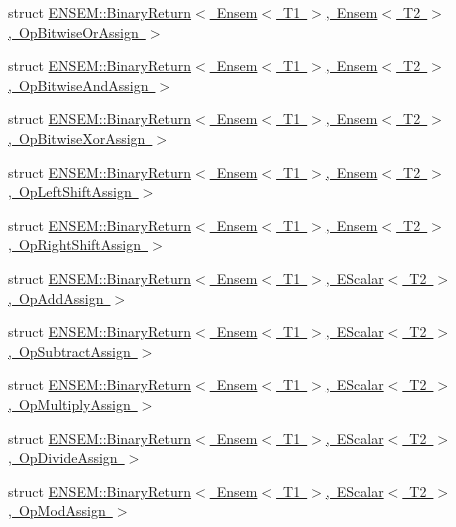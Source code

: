 \begin{DoxyCompactItemize}
\item 
struct \mbox{\hyperlink{structENSEM_1_1BinaryReturn_3_01Ensem_3_01T1_01_4_00_01Ensem_3_01T2_01_4_00_01OpBitwiseOrAssign_01_4}{E\+N\+S\+E\+M\+::\+Binary\+Return$<$ Ensem$<$ T1 $>$, Ensem$<$ T2 $>$, Op\+Bitwise\+Or\+Assign $>$}}
\item 
struct \mbox{\hyperlink{structENSEM_1_1BinaryReturn_3_01Ensem_3_01T1_01_4_00_01Ensem_3_01T2_01_4_00_01OpBitwiseAndAssign_01_4}{E\+N\+S\+E\+M\+::\+Binary\+Return$<$ Ensem$<$ T1 $>$, Ensem$<$ T2 $>$, Op\+Bitwise\+And\+Assign $>$}}
\item 
struct \mbox{\hyperlink{structENSEM_1_1BinaryReturn_3_01Ensem_3_01T1_01_4_00_01Ensem_3_01T2_01_4_00_01OpBitwiseXorAssign_01_4}{E\+N\+S\+E\+M\+::\+Binary\+Return$<$ Ensem$<$ T1 $>$, Ensem$<$ T2 $>$, Op\+Bitwise\+Xor\+Assign $>$}}
\item 
struct \mbox{\hyperlink{structENSEM_1_1BinaryReturn_3_01Ensem_3_01T1_01_4_00_01Ensem_3_01T2_01_4_00_01OpLeftShiftAssign_01_4}{E\+N\+S\+E\+M\+::\+Binary\+Return$<$ Ensem$<$ T1 $>$, Ensem$<$ T2 $>$, Op\+Left\+Shift\+Assign $>$}}
\item 
struct \mbox{\hyperlink{structENSEM_1_1BinaryReturn_3_01Ensem_3_01T1_01_4_00_01Ensem_3_01T2_01_4_00_01OpRightShiftAssign_01_4}{E\+N\+S\+E\+M\+::\+Binary\+Return$<$ Ensem$<$ T1 $>$, Ensem$<$ T2 $>$, Op\+Right\+Shift\+Assign $>$}}
\item 
struct \mbox{\hyperlink{structENSEM_1_1BinaryReturn_3_01Ensem_3_01T1_01_4_00_01EScalar_3_01T2_01_4_00_01OpAddAssign_01_4}{E\+N\+S\+E\+M\+::\+Binary\+Return$<$ Ensem$<$ T1 $>$, E\+Scalar$<$ T2 $>$, Op\+Add\+Assign $>$}}
\item 
struct \mbox{\hyperlink{structENSEM_1_1BinaryReturn_3_01Ensem_3_01T1_01_4_00_01EScalar_3_01T2_01_4_00_01OpSubtractAssign_01_4}{E\+N\+S\+E\+M\+::\+Binary\+Return$<$ Ensem$<$ T1 $>$, E\+Scalar$<$ T2 $>$, Op\+Subtract\+Assign $>$}}
\item 
struct \mbox{\hyperlink{structENSEM_1_1BinaryReturn_3_01Ensem_3_01T1_01_4_00_01EScalar_3_01T2_01_4_00_01OpMultiplyAssign_01_4}{E\+N\+S\+E\+M\+::\+Binary\+Return$<$ Ensem$<$ T1 $>$, E\+Scalar$<$ T2 $>$, Op\+Multiply\+Assign $>$}}
\item 
struct \mbox{\hyperlink{structENSEM_1_1BinaryReturn_3_01Ensem_3_01T1_01_4_00_01EScalar_3_01T2_01_4_00_01OpDivideAssign_01_4}{E\+N\+S\+E\+M\+::\+Binary\+Return$<$ Ensem$<$ T1 $>$, E\+Scalar$<$ T2 $>$, Op\+Divide\+Assign $>$}}
\item 
struct \mbox{\hyperlink{structENSEM_1_1BinaryReturn_3_01Ensem_3_01T1_01_4_00_01EScalar_3_01T2_01_4_00_01OpModAssign_01_4}{E\+N\+S\+E\+M\+::\+Binary\+Return$<$ Ensem$<$ T1 $>$, E\+Scalar$<$ T2 $>$, Op\+Mod\+Assign $>$}}

\end{DoxyCompactItemize}
